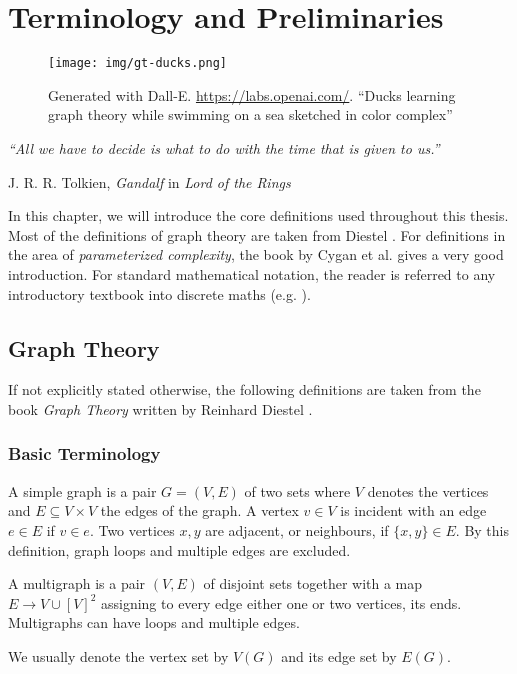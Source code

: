 \chapter{Terminology and Preliminaries}\label{ch:prelim}

\vspace*{-50pt}

\begin{figure}[ht]
        \texttt{[image: img/gt-ducks.png]}
        \captionsetup{textformat=empty,labelformat=blank}
        \caption{Generated with Dall-E. \url{https://labs.openai.com/}. ``Ducks learning graph theory while swimming on a sea sketched in color complex''}
\end{figure}

\epigraph{\itshape ``All we have to decide is what to do with the time that is given to us.''}{J. R. R. Tolkien, \textit{Gandalf} in \textit{Lord of the Rings}}


In this chapter, we will introduce the core definitions used throughout this thesis. 
Most of the definitions of graph theory are taken from Diestel \cite{Diekert2005}. 
For definitions in the area of \textit{parameterized complexity}, the book by Cygan et al.\cite{Cygan2015} gives a very good introduction.
For standard mathematical notation, the reader is referred to any introductory textbook into discrete maths (e.g. \cite{Rosen2012}).

\section{Graph Theory}

If not explicitly stated otherwise, the following definitions are taken from the book \textit{Graph Theory} written by Reinhard Diestel \cite{diestel10}.

\subsection{Basic Terminology}

\begin{definition}[Graph]
    A simple graph is a pair $G = (V, E)$ of two sets where $V$ denotes the vertices and $E \subseteq V \times V$ the edges of the graph.  A vertex $v \in V$ is incident with an edge $e \in E$ if $v \in e$. Two vertices $x, y$ are adjacent, or neighbours, if $\{x,y \} \in E$. By this definition, graph loops and multiple edges are excluded.
    
    A multigraph is a pair $(V, E)$ of disjoint sets together with a map $E \rightarrow V \cup [V]^2$ assigning to every edge either one or two vertices, its ends. Multigraphs can have loops and multiple edges.
    
    We usually denote the vertex set by $V(G)$ and its edge set by $E(G)$.



\end{definition}


